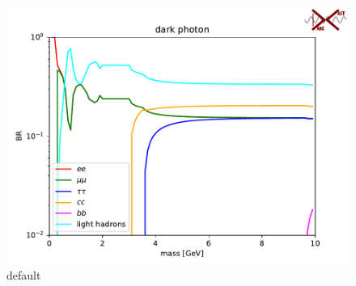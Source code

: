 \documentclass[aps,onecolumn,twoside,secnumarabic,balancelastpage,amsmath,amssymb,nofootinbib,hyperref=pdftex]{revtex4}
\begin{document}
\begin{figure}[htbp]
\begin{center}
\includegraphics[width=12cm]{BR.pdf}
\caption{default}
\label{fig:BR}
\end{center}
\end{figure}
\end{document}
